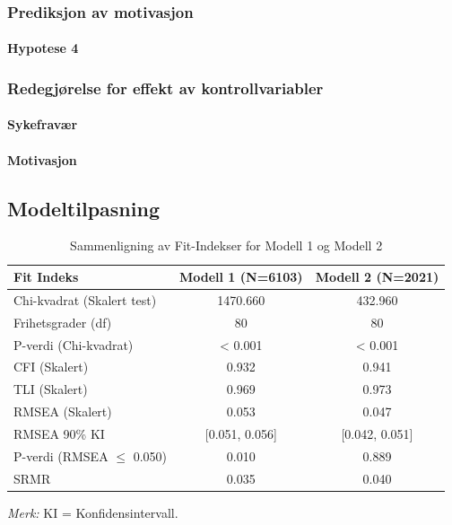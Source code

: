 \documentclass[
  12pt,
  a4paper,
  DIV=11,
  numbers=noendperiod]{scrartcl}
\let\oldparagraph\paragraph
\renewcommand{\paragraph}[1]{\oldparagraph{#1}\mbox{}}
\begin{document}
\subsubsection{Prediksjon av
motivasjon}\label{prediksjon-av-motivasjon-1}

\paragraph{Hypotese 4}\label{hypotese-4-1}

\subsubsection{Redegjørelse for effekt av
kontrollvariabler}\label{redegjuxf8relse-for-effekt-av-kontrollvariabler-1}

\paragraph{Sykefravær}\label{sykefravuxe6r-2}

\paragraph{Motivasjon}\label{motivasjon-2}

\subsection{Modeltilpasning}\label{modeltilpasning}

\begin{table}[htbp]
\centering
\caption{Sammenligning av Fit-Indekser for Modell 1 og Modell 2}
\label{tab:fit_comparison_model1_model2}
\begin{tabular}{@{}lcc@{}}
\toprule
Fit Indeks                      & Modell 1 (N=6103) & Modell 2 (N=2021) \\
\midrule
Chi-kvadrat (Skalert test)      & 1470.660          & 432.960           \\
Frihetsgrader (df)              & 80                & 80                \\
P-verdi (Chi-kvadrat)           & < 0.001           & < 0.001           \\
CFI (Skalert)                   & 0.932             & 0.941             \\
TLI (Skalert)                   & 0.969             & 0.973             \\
RMSEA (Skalert)                 & 0.053             & 0.047             \\
RMSEA 90\% KI                   & [0.051, 0.056]    & [0.042, 0.051]    \\
P-verdi (RMSEA $\le$ 0.050)     & 0.010             & 0.889             \\
SRMR                            & 0.035             & 0.040             \\
\bottomrule
\end{tabular}
\footnotesize{%
\textit{Merk:} KI = Konfidensintervall.
}
\end{table}
\end{document}
